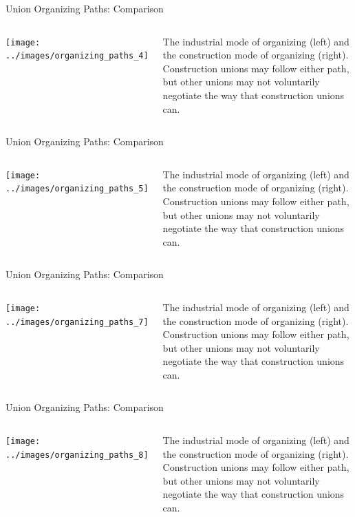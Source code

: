 \documentclass{beamer}
\begin{document}
\begin{frame}{Union Organizing Paths: Comparison}
  \begin{columns}
    \texttt{[image: ../images/organizing\_paths\_4]}

    The industrial mode of organizing (left) and the construction mode of organizing (right).\newline\newline
    Construction unions may follow either path, but other unions may not voluntarily negotiate the way that construction unions can.
    \end{columns}
\end{frame}

\begin{frame}{Union Organizing Paths: Comparison}
  \begin{columns}
    \texttt{[image: ../images/organizing\_paths\_5]}

    The industrial mode of organizing (left) and the construction mode of organizing (right).\newline\newline
    Construction unions may follow either path, but other unions may not voluntarily negotiate the way that construction unions can.
    \end{columns}
\end{frame}

\begin{frame}{Union Organizing Paths: Comparison}
  \begin{columns}
    \texttt{[image: ../images/organizing\_paths\_7]}

    The industrial mode of organizing (left) and the construction mode of organizing (right).\newline\newline
    Construction unions may follow either path, but other unions may not voluntarily negotiate the way that construction unions can.
    \end{columns}
\end{frame}

\begin{frame}{Union Organizing Paths: Comparison}
  \begin{columns}
    \texttt{[image: ../images/organizing\_paths\_8]}

    The industrial mode of organizing (left) and the construction mode of organizing (right).\newline\newline
    Construction unions may follow either path, but other unions may not voluntarily negotiate the way that construction unions can.
    \end{columns}
\end{frame}
\end{document}
